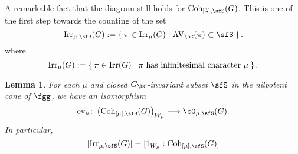 \documentclass[12pt,a4paper]{amsart}
\newcommand{\AVC}{\mathrm{AV}_\bC}
\def\abs#1{\left|{#1}\right|}
\numberwithin{equation}{section}
\newtheorem{lem}[thm]{Lemma}
\newtheorem{eg}[thm]{Example}
\theoremstyle{remark}
\def\Irr{\mathrm{Irr}}
\def\Gc{G_\bC}
\def\Coh{\mathrm{Coh}}
\def\bev#1{\overline{\mathrm{ev}}_{#1}}
\begin{document}

A remarkable fact that the diagram  still holds for
$\Coh_{[\lambda],\sfS}(G)$. This is one of the first step towards the counting
of the set
\[
  \Irr_{\mu,\sfS}(G):=\Set{\pi \in \Irr_{\mu}(G)| \text{$\AVC(\pi)\subset \sfS$} }.
\]
where
\[
  \Irr_{\mu}(G):=\Set{\pi \in \Irr(G)| \pi \text{ has infinitesimal character
    }\mu}.
\]


\begin{lem}\label{lem:coh.count}
  For each $\mu$ and closed $\Gc$-invariant subset $\sfS$ in the nilpotent cone
  of $\fgg$, we have an isomorphism
  \[
    \bev{\mu}\colon \left(\Coh_{[\mu],\sfS}(G)\right)_{W_{\mu}} \longrightarrow \Grt_{\mu,\sfS}(G).
  \]
  In particular,
  \[
    \abs{\Irr_{\mu,\sfS}(G)} = [1_{W_{\mu}}:\Coh_{[\mu],\sfS}(G)]
  \]
\end{lem}
\end{document}
